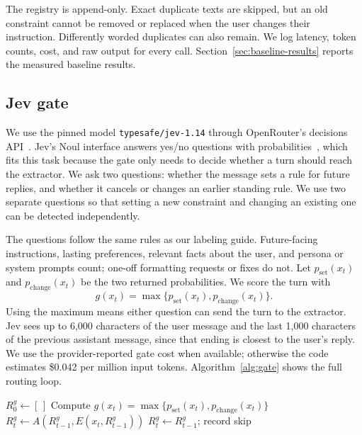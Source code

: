 The registry is append-only. Exact duplicate texts are skipped, but an old constraint cannot be removed or replaced when the user changes their instruction. Differently worded duplicates can also remain. We log latency, token counts, cost, and raw output for every call. Section~\ref{sec:baseline-results} reports the measured baseline results.

\subsection{Jev gate}
We use the pinned model \texttt{typesafe/jev-1.14} through OpenRouter's decisions API~\cite{openrouterdecisions}. Jev's Noul interface answers yes/no questions with probabilities~\cite{typesafenoul}, which fits this task because the gate only needs to decide whether a turn should reach the extractor. We ask two questions: whether the message sets a rule for future replies, and whether it cancels or changes an earlier standing rule. We use two separate questions so that setting a new constraint and changing an existing one can be detected independently.

The questions follow the same rules as our labeling guide. Future-facing instructions, lasting preferences, relevant facts about the user, and persona or system prompts count; one-off formatting requests or fixes do not. Let $p_{\mathrm{set}}(x_t)$ and $p_{\mathrm{change}}(x_t)$ be the two returned probabilities. We score the turn with
\begin{equation}
g(x_t)=\max\{p_{\mathrm{set}}(x_t),p_{\mathrm{change}}(x_t)\}.
\end{equation}
Using the maximum means either question can send the turn to the extractor. Jev sees up to 6,000 characters of the user message and the last 1,000 characters of the previous assistant message, since that ending is closest to the user's reply. We use the provider-reported gate cost when available; otherwise the code estimates \$0.042 per million input tokens. Algorithm~\ref{alg:gate} shows the full routing loop.

\begin{algorithm}[t]
\caption{Gated extraction with an append-only registry}
\label{alg:gate}
\begin{algorithmic}[1]
\STATE $R_0^g\gets[\,]$
\STATE Compute $g(x_t)=\max\{p_{\mathrm{set}}(x_t),p_{\mathrm{change}}(x_t)\}$
\STATE $R_t^g\gets A(R_{t-1}^g,E(x_t,R_{t-1}^g))$
\ELSE
\STATE $R_t^g\gets R_{t-1}^g$; record skip
\ENDIF
\ENDFOR
\end{algorithmic}
\end{algorithm}

